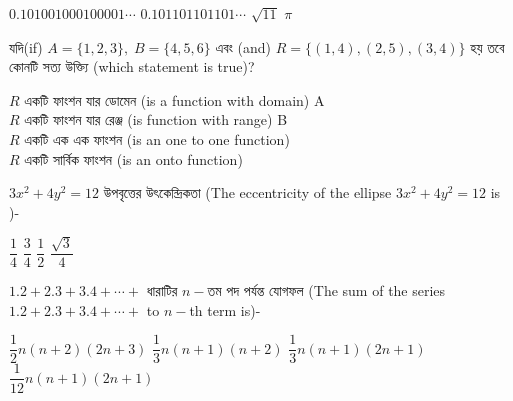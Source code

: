 \documentclass[addpoints]{exam}
\begin{document}
\begin{questions}
\begin{oneparchoices}
\choice $ 0.101001000100001 \cdots $
\choice $ 0.101101101101\cdots $
\choice $ \sqrt{11} $
\choice $ \pi $
\end{oneparchoices}

\question  যদি(if) $ A = \{1,2,3\},\; B=\{4,5,6\}  $ এবং (and) $ R = \{(1,4),(2,5),(3,4)\} $  হয় তবে কোনটি সত্য উক্ত্যি (which statement is true)?


\begin{oneparchoices}

\choice $ R $ একটি ফাংশন যার ডোমেন (is a function with domain) A\\
\choice $ R $ একটি ফাংশন যার রেঞ্জ (is function with range) B\\
\choice $ R $ একটি এক এক ফাংশন (is an one to one function)\\
\choice $ R $ একটি সার্বিক ফাংশন (is an onto function) 
\end{oneparchoices}

\question $ 3x^{2}+4y^{2}=12 $ উপবৃত্তের উৎকেন্দ্রিকতা (The eccentricity of the ellipse $ 3x^{2}+4y^{2}=12 $ is )-

\begin{oneparchoices}
\choice $ \dfrac{1}{4} $
\choice $ \dfrac{3}{4} $
\choice $ \dfrac{1}{2} $
\choice $ \dfrac{\sqrt{3}}{4} $

\end{oneparchoices}

\question $ 1.2+2.3+3.4+\cdots + $ ধারাটির $ n- $তম পদ পর্যন্ত যোগফল (The sum of the series $ 1.2+2.3+3.4+\cdots + $ to $ n- $th term is)-

\begin{oneparchoices}
\choice $ \dfrac{1}{2}n(n+2)(2n+3)$
\choice $ \dfrac{1}{3}n(n+1)(n+2)$
\choice $ \dfrac{1}{3}n(n+1)(2n+1)$
\choice $ \dfrac{1}{12}n(n+1)(2n+1)$
\end{oneparchoices}


\end{questions}
\end{document}
